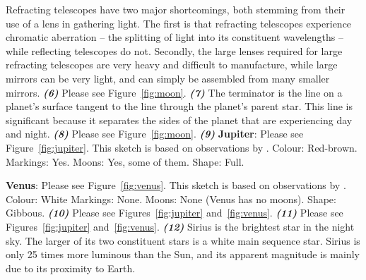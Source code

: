 \documentclass[11pt]{article}
\begin{document}
Refracting telescopes have two major shortcomings, both stemming from their use of a lens in gathering light.
The first is that refracting telescopes experience chromatic aberration -- the splitting of light into its constituent wavelengths -- while reflecting telescopes do not.
Secondly, the large lenses required for large refracting telescopes are very heavy and difficult to manufacture, while large mirrors can be very light, and can simply be assembled from many smaller mirrors.
\newline
\newline
\noindent
\textbf{\emph{(6)}}
Please see Figure~\ref{fig:moon}.
\newline
\newline
\noindent
\textbf{\emph{(7)}}
The terminator is the line on a planet's surface tangent to the line through the planet's parent star.
This line is significant because it separates the sides of the planet that are experiencing day and night.
\newline
\newline
\noindent
\textbf{\emph{(8)}}
Please see Figure~\ref{fig:moon}.
\newline
\newline
\noindent
\textbf{\emph{(9)}}
\textbf{Jupiter}: Please see Figure~\ref{fig:jupiter}.
This sketch is based on observations by \cite{deepskywatch}.
\newline
Colour: Red-brown.
\newline
Markings: Yes.
\newline
Moons: Yes, some of them.
\newline
Shape: Full.

\textbf{Venus}: Please see Figure~\ref{fig:venus}.
This sketch is based on observations by \cite{nakedeyeplanets}.
\newline
Colour: White
\newline
Markings: None.
\newline
Moons: None (Venus has no moons).
\newline
Shape: Gibbous.
\newline
\newline
\noindent
\textbf{\emph{(10)}}
Please see Figures~\ref{fig:jupiter} and~\ref{fig:venus}.
\newline
\newline
\noindent
\textbf{\emph{(11)}}
Please see Figures~\ref{fig:jupiter} and~\ref{fig:venus}.
\newline
\newline
\noindent
\textbf{\emph{(12)}}
Sirius is the brightest star in the night sky.
The larger of its two constituent stars is a white main sequence star.
Sirius is only 25 times more luminous than the Sun, and its apparent magnitude is mainly due to its proximity to Earth.
\end{document}
